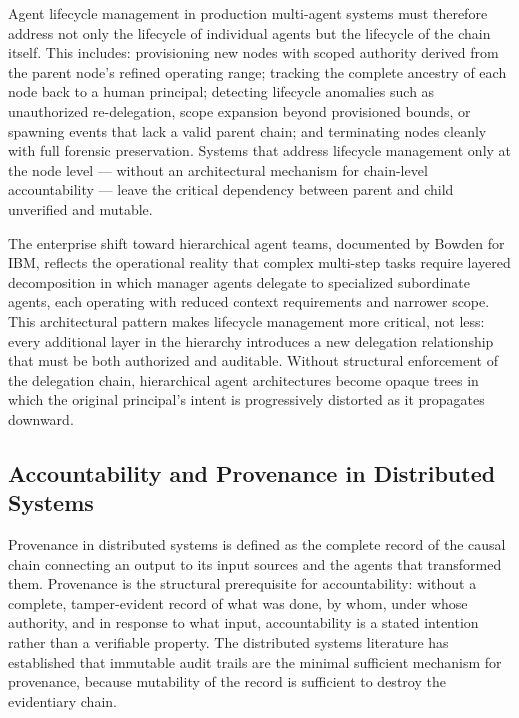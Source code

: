Agent lifecycle management in production multi-agent systems must therefore address not only the lifecycle of individual agents but the lifecycle of the chain itself. This includes: provisioning new nodes with scoped authority derived from the parent node's refined operating range; tracking the complete ancestry of each node back to a human principal; detecting lifecycle anomalies such as unauthorized re-delegation, scope expansion beyond provisioned bounds, or spawning events that lack a valid parent chain; and terminating nodes cleanly with full forensic preservation. Systems that address lifecycle management only at the node level — without an architectural mechanism for chain-level accountability — leave the critical dependency between parent and child unverified and mutable.\cite{multi_agent_coordination_strategies}

The enterprise shift toward hierarchical agent teams, documented by Bowden for IBM, reflects the operational reality that complex multi-step tasks require layered decomposition in which manager agents delegate to specialized subordinate agents, each operating with reduced context requirements and narrower scope.\cite{ibm_hierarchical_agent_hierarchies} This architectural pattern makes lifecycle management more critical, not less: every additional layer in the hierarchy introduces a new delegation relationship that must be both authorized and auditable. Without structural enforcement of the delegation chain, hierarchical agent architectures become opaque trees in which the original principal's intent is progressively distorted as it propagates downward.

\subsection{Accountability and Provenance in Distributed Systems}
\label{sec:rs-accountability}

Provenance in distributed systems is defined as the complete record of the causal chain connecting an output to its input sources and the agents that transformed them.\cite{immutable_audit_trails_blockchain} Provenance is the structural prerequisite for accountability: without a complete, tamper-evident record of what was done, by whom, under whose authority, and in response to what input, accountability is a stated intention rather than a verifiable property. The distributed systems literature has established that immutable audit trails are the minimal sufficient mechanism for provenance, because mutability of the record is sufficient to destroy the evidentiary chain.\cite{blockchain_ai_governance}

